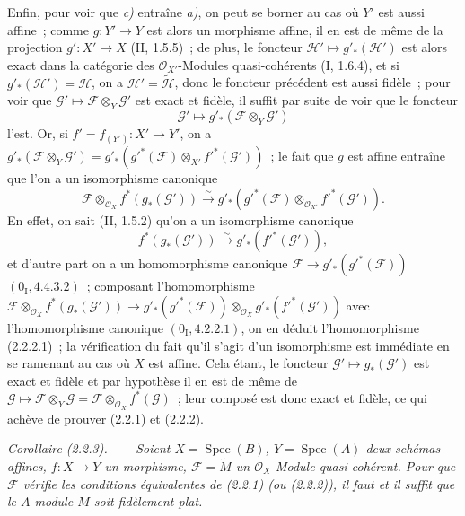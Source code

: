 \documentclass[10pt,oneside]{book}
\newenvironment{corollary}[1][]{%
  \par\medskip\noindent\itshape Corollaire (#1). ---\ }{\par}
\begin{document}
Enfin, pour voir que \emph{c)} entraîne \emph{a)}, on peut se borner au cas
où $Y'$ est aussi affine~; comme $g:Y'\to Y$ est alors un morphisme affine,
il en est de même de la projection $g':X'\to X$ (II, 1.5.5)~; de plus, le
foncteur $\mathscr H'\mapsto g'_*(\mathscr H')$ est alors exact dans la
catégorie des $\mathcal O_{X'}$-Modules quasi-cohérents (I, 1.6.4), et si
$g'_*(\mathscr H')=\mathscr H$, on a $\mathscr H'=\widetilde{\mathscr H}$,
donc le foncteur précédent est aussi fidèle~; pour voir que
$\mathscr G'\mapsto\mathscr F\otimes_Y\mathscr G'$ est exact et fidèle, il
suffit par suite de voir que le foncteur
\[
\mathscr G'\mapsto g'_*(\mathscr F\otimes_Y\mathscr G')
\]
l'est. Or, si $f'=f_{(Y')}:X'\to Y'$, on a
$g'_*(\mathscr F\otimes_Y\mathscr G')
=g'_*(g'^*(\mathscr F)\otimes_{X'}f'^*(\mathscr G'))$~; le fait que $g$ est
affine entraîne que l'on a un isomorphisme canonique
\begin{equation}
\tag{2.2.2.1}
\label{IV.2.2.2.1-fr}
\mathscr F\otimes_{\mathcal O_X}f^*(g_*(\mathscr G'))
\xrightarrow{\sim}
g'_*(g'^*(\mathscr F)\otimes_{\mathcal O_{X'}}f'^*(\mathscr G')).
\end{equation}
En effet, on sait (II, 1.5.2) qu'on a un isomorphisme canonique
\[
f^*(g_*(\mathscr G'))\xrightarrow{\sim}g'_*(f'^*(\mathscr G')),
\]
et d'autre part on a un homomorphisme canonique
$\mathscr F\to g'_*(g'^*(\mathscr F))$ $(0_{\mathrm I},4.4.3.2)$~;
composant l'homomorphisme
$\mathscr F\otimes_{\mathcal O_X}f^*(g_*(\mathscr G'))
\to g'_*(g'^*(\mathscr F))\otimes_{\mathcal O_X}g'_*(f'^*(\mathscr G'))$
avec l'homomorphisme canonique $(0_{\mathrm I},4.2.2.1)$, on en déduit
l'homomorphisme (2.2.2.1)~; la vérification du fait qu'il s'agit d'un
isomorphisme est immédiate en se ramenant au cas où $X$ est affine. Cela
étant, le foncteur $\mathscr G'\mapsto g_*(\mathscr G')$ est exact et fidèle
et par hypothèse il en est de même de
$\mathscr G\mapsto\mathscr F\otimes_Y\mathscr G
=\mathscr F\otimes_{\mathcal O_X}f^*(\mathscr G)$~; leur composé est donc
exact et fidèle, ce qui achève de prouver (2.2.1) et (2.2.2).

\begin{corollary}[2.2.3]
\label{IV.2.2.3-fr}
Soient $X=\operatorname{Spec}(B)$, $Y=\operatorname{Spec}(A)$ deux schémas
affines, $f:X\to Y$ un morphisme, $\mathscr F=\widetilde M$ un
$\mathcal O_X$-Module quasi-cohérent. Pour que $\mathscr F$ vérifie les
conditions équivalentes de (2.2.1) (ou (2.2.2)), il faut et il suffit que le
$A$-module $M$ soit fidèlement plat.
\end{corollary}
\end{document}
